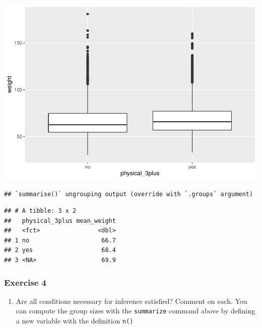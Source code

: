 \documentclass[
]{article}
\newenvironment{Shaded}{\begin{snugshade}}{\end{snugshade}}
\newcommand{\DataTypeTok}[1]{\textcolor[rgb]{0.13,0.29,0.53}{#1}}
\newcommand{\KeywordTok}[1]{\textcolor[rgb]{0.13,0.29,0.53}{\textbf{#1}}}
\newcommand{\NormalTok}[1]{#1}
\newcommand{\OperatorTok}[1]{\textcolor[rgb]{0.81,0.36,0.00}{\textbf{#1}}}
\newcommand{\OtherTok}[1]{\textcolor[rgb]{0.56,0.35,0.01}{#1}}
\newcommand{\StringTok}[1]{\textcolor[rgb]{0.31,0.60,0.02}{#1}}
\providecommand{\tightlist}{%
  \setlength{\itemsep}{0pt}\setlength{\parskip}{0pt}}
\begin{document}
\includegraphics{lab-7_files/figure-latex/unnamed-chunk-3-1.pdf}

\begin{Shaded}
\end{Shaded}

\begin{verbatim}
## `summarise()` ungrouping output (override with `.groups` argument)
\end{verbatim}

\begin{verbatim}
## # A tibble: 3 x 2
##   physical_3plus mean_weight
##   <fct>                <dbl>
## 1 no                    66.7
## 2 yes                   68.4
## 3 <NA>                  69.9
\end{verbatim}

\hypertarget{exercise-4}{%
\subsubsection{Exercise 4}\label{exercise-4}}

\begin{enumerate}
\def\labelenumi{\arabic{enumi}.}
\tightlist
\item
  Are all conditions necessary for inference satisfied? Comment on each.
  You can compute the group sizes with the \texttt{summarize} command
  above by defining a new variable with the definition \texttt{n()}
\end{enumerate}
\end{document}
